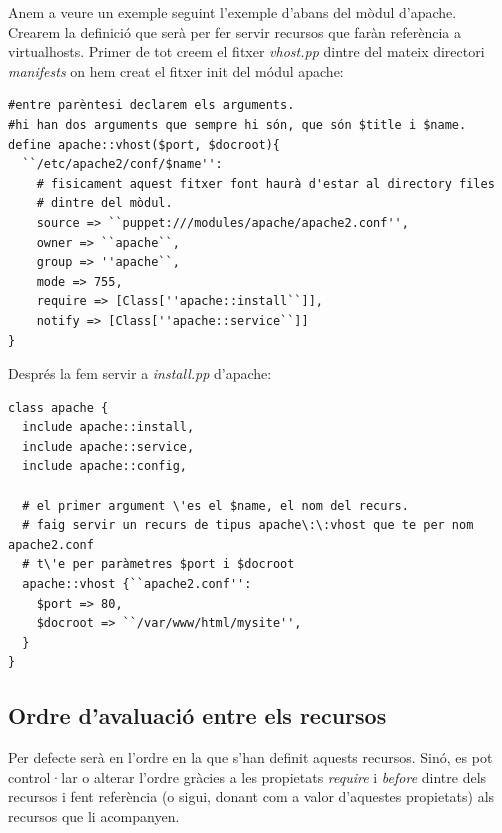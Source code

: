 \documentclass[a4paper]{article}
\begin{document}
Anem a veure un exemple seguint l'exemple d'abans del mòdul d'apache. Crearem la definició que serà per fer servir recursos que faràn referència  a virtualhosts. Primer de tot creem el fitxer \textit{vhost.pp} dintre del mateix directori \textit{manifests} on hem creat el fitxer init del módul apache:
\begin{verbatim}
#entre parèntesi declarem els arguments.
#hi han dos arguments que sempre hi són, que són $title i $name.
define apache::vhost($port, $docroot){
  ``/etc/apache2/conf/$name'':
    # fisicament aquest fitxer font haurà d'estar al directory files 
    # dintre del mòdul.
    source => ``puppet:///modules/apache/apache2.conf'',
    owner => ``apache``,
    group => ''apache``,
    mode => 755,
    require => [Class[''apache::install``]],
    notify => [Class[''apache::service``]]
}
\end{verbatim}
Despr\'es la fem servir a \textit{install.pp} d'apache:
\begin{verbatim}
class apache {
  include apache::install,
  include apache::service,
  include apache::config,

  # el primer argument \'es el $name, el nom del recurs.
  # faig servir un recurs de tipus apache\:\:vhost que te per nom apache2.conf
  # t\'e per paràmetres $port i $docroot
  apache::vhost {``apache2.conf'':
    $port => 80,
    $docroot => ``/var/www/html/mysite'',
  }
}
\end{verbatim}
\subsection{Ordre d'avaluació entre els recursos}
Per defecte serà en l'ordre en la que s'han definit aquests recursos. Sinó, es pot control·lar o alterar l'ordre gràcies a les propietats \textit{require} i \textit{before} dintre dels recursos i fent referència (o sigui, donant com a valor d'aquestes propietats) als recursos que li acompanyen.
\end{document}
